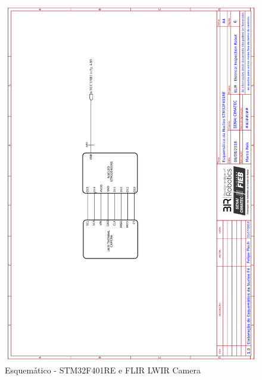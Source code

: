     \begin{figure}[H]
	\centering
	\includegraphics[width=14cm]{Figures/EsquematicoFLIR.png}
	\caption{Esquemático - STM32F401RE e FLIR LWIR Camera} \label{FLIR}
	\end{figure}
	
	\pagebreak
	
